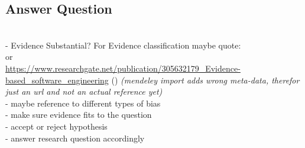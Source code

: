 
\subsection{Answer Question}
\label{subsec:answer question}

\\
- Evidence Substantial? For Evidence classification maybe quote:\\
\cite{Wohlin2013EvidenceProfile} or \\
\url{https://www.researchgate.net/publication/305632179_Evidence-based_software_engineering} () \textit{(mendeley import adds wrong meta-data, therefor just an url and not an actual reference yet)}\\
- maybe reference to different types of bias\\
- make sure evidence fits to the question\\
- accept or reject hypothesis\\
- answer research question accordingly\\
